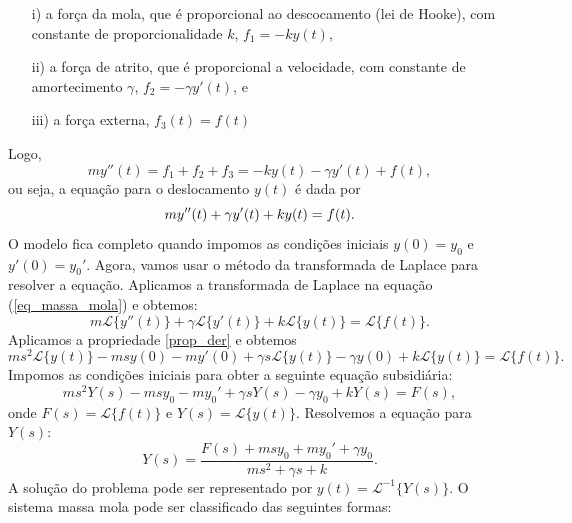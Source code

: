 \begin{itemize}
 \item[i)] a força da mola, que é proporcional ao descocamento (lei de Hooke), com constante de proporcionalidade $k$, $f_1=-k y(t)$,
 \item[ii)] a força de atrito, que é proporcional a velocidade, com constante de amortecimento $\gamma$, $f_2=-\gamma y'(t)$, e
 \item[iii)] a força externa, $f_3(t)=f(t)$
\end{itemize}
Logo,
\begin{equation}
my''(t)=f_1+f_2+f_3=-ky(t)-\gamma y'(t)+f(t),
\end{equation}
ou seja, a equação para o deslocamento $y(t)$ é dada por
\begin{equation}{\label{eq_massa_mola}}
my''(t)+\gamma y'(t)+ky(t)=f(t).
\end{equation}
O modelo fica completo quando impomos as condições iniciais $y(0)=y_0$ e $y'(0)=y_0'$. 
Agora, vamos usar o método da transformada de Laplace para resolver a equação. Aplicamos a transformada de Laplace na equação (\ref{eq_massa_mola}) e obtemos:
\begin{equation}
m\mathcal{L}\{y''(t)\}+\gamma \mathcal{L}\{y'(t)\}+k\mathcal{L}\{y(t)\}=\mathcal{L}\{f(t)\}.
\end{equation}
Aplicamos a propriedade \ref{prop_der} e obtemos
\begin{equation}
ms^2\mathcal{L}\{y(t)\}-msy(0)-my'(0)+\gamma s\mathcal{L}\{y(t)\}-\gamma y(0)+k\mathcal{L}\{y(t)\}=\mathcal{L}\{f(t)\}.
\end{equation}
Impomos as condições iniciais para obter a seguinte equação subsidiária:
\begin{equation}
ms^2Y(s)-msy_0-my_0'+\gamma sY(s)-\gamma y_0+kY(s)=F(s),
\end{equation}
onde $F(s)=\mathcal{L}\{f(t)\}$ e $Y(s)=\mathcal{L}\{y(t)\}$. Resolvemos a equação para $Y(s)$:
\begin{equation}
Y(s)=\frac{F(s)+msy_0+my_0'+\gamma y_0}{ms^2+\gamma s +k}.
\end{equation}
A solução do problema pode ser representado por $y(t)=\mathcal{L}^{-1}\{Y(s)\}$. 
O sistema massa mola pode ser classificado das seguintes formas:
